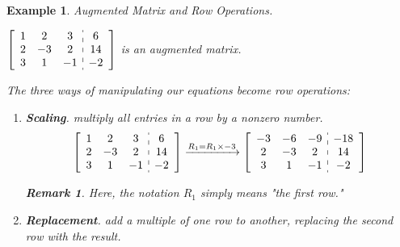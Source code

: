 \documentclass[12pt, a4paper]{article}
\newtheorem{eg}{Example}[subsection]
\newtheorem*{rmk}{\indent Remark}
\begin{document}
\begin{eg}
Augmented Matrix and Row Operations. \par
\begin{center}
$\left[\begin{array}{c:c}\begin{matrix}1&2&3\\2&-3&2\\3&1&-1\end{matrix}&\begin{matrix}6\\14\\-2\end{matrix}\end{array}\right]$ is an augmented matrix. 
\end{center}
The three ways of manipulating our equations become row operations:
\begin{enumerate}
\item \textbf{Scaling}. multiply all entries in a row by a nonzero number. 
$$\left[\begin{array}{c:c}\begin{matrix}1&2&3\\2&-3&2\\3&1&-1\end{matrix}&\begin{matrix}6\\14\\-2\end{matrix}\end{array}\right]\xrightarrow[]{R_1=R_1\times-3} \left[\begin{array}{c:c}\begin{matrix}-3&-6&-9\\2&-3&2\\3&1&-1\end{matrix}&\begin{matrix}-18\\14\\-2\end{matrix}\end{array}\right]$$
\begin{rmk}Here, the notation $R_1$ simply means "the first row."\end{rmk}
\item \textbf{Replacement}. add a multiple of one row to another, replacing the second row with the result. 

\end{enumerate}
\end{eg}
\end{document}
